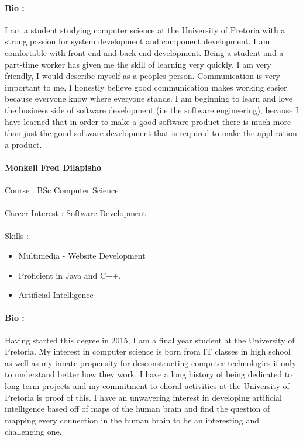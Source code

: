 \documentclass[11pt]{article}
\begin{document}
\paragraph{Bio :} I am a student studying computer science at the University of Pretoria with a strong passion for system development and component development.  I am comfortable with front-end and back-end development. Being a student and a part-time worker has given me the skill of learning very quickly. I am very friendly, I would describe myself as a peoples person. Communication is very important to me, I honestly believe good communication makes working easier because everyone know where everyone stands. I am beginning to learn and love the business side of software development (i.e the software engineering), because I have learned that in order to make a good software product there is much more than just the good software development that is required to make the application a product.


\paragraph{}\textbf{Monkeli Fred Dilapisho}
\paragraph{}Course : BSc Computer Science
\paragraph{}Career Interest : Software Development
\paragraph{}Skills : 
\begin{itemize}
\item Multimedia - Website Development
\item Proficient in Java and C++.
\item Artificial Intelligence
\end{itemize}
\paragraph{Bio :} Having started this degree in 2015, I am a final year student at the University of Pretoria. My interest in computer science is born from IT classes in high school as well as my innate propensity for desconstructing computer technologies if only to understand better how they work. I have a long history of being dedicated to long term projects and my commitment to choral activities at the University of Pretoria is proof of this. I have an unwavering interest in developing artificial intelligence based off of maps of the human brain and find the question of mapping every connection in the human brain to be an interesting and challenging one.
\end{document}
